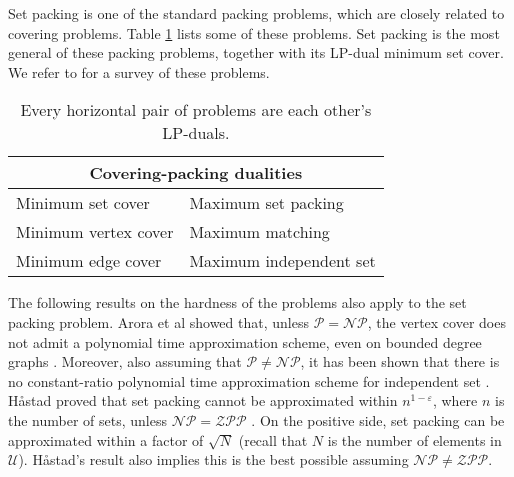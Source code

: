 Set packing is one of the standard packing problems, which are closely related to covering problems. Table \ref{tab:PackingCovering} lists some of these problems. Set packing is the most general of these packing problems, together with its LP-dual minimum set cover. We refer to \cite{Reductions} for a survey of these problems.
%
\begin{table}
\centering
\begin{tabular}{ll}
  \toprule
  \multicolumn{2}{c}{Covering-packing dualities} \\
  \midrule
  Minimum set cover    & Maximum set packing \\
  Minimum vertex cover & Maximum matching \\
  Minimum edge cover   & Maximum independent set \\
  \bottomrule
\end{tabular}
\caption{Every horizontal pair of problems are each other's LP-duals.}
\label{tab:PackingCovering}
\end{table}

The following results on the hardness of the problems also apply to the set packing problem. Arora et al showed that, unless $\mathcal{P} = \mathcal{NP}$, the vertex cover does not admit a polynomial time approximation scheme, even on bounded degree graphs \cite{noPTAS1}. Moreover, also assuming that $\mathcal{P} \neq \mathcal{NP}$, it has been shown that there is no constant-ratio polynomial time approximation scheme for independent set \cite{noPTAS2,NoPTAS3}. H{\aa}stad proved that set packing cannot be approximated within $n^{1 - \varepsilon}$, where $n$ is the number of sets, unless $\mathcal{NP} = \mathcal{ZPP}$ \cite{CliqueIsHard}. On the positive side, set packing can be approximated within a factor of $\sqrt{N}$ \cite{GeneralSP} (recall that $N$ is the number of elements in $\mathcal{U}$). H{\aa}stad's result also implies this is the best possible assuming $\mathcal{NP} \neq \mathcal{ZPP}$. %

